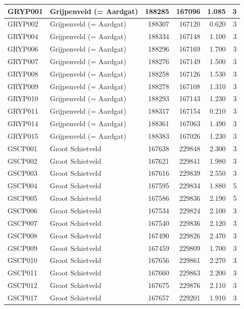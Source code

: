 \documentclass[11pt,]{book}
\begin{document}
\begin{table}
\begin{tabular}[t]{l|l|r|r|r|r}
\hline
GRYP001 & Grijpenveld (= Aardgat) & 188285 & 167096 & 1.085 & 3\\
\hline
GRYP002 & Grijpenveld (= Aardgat) & 188307 & 167120 & 0.620 & 3\\
\hline
GRYP004 & Grijpenveld (= Aardgat) & 188334 & 167148 & 1.100 & 3\\
\hline
GRYP006 & Grijpenveld (= Aardgat) & 188296 & 167169 & 1.700 & 3\\
\hline
GRYP007 & Grijpenveld (= Aardgat) & 188276 & 167149 & 1.500 & 3\\
\hline
GRYP008 & Grijpenveld (= Aardgat) & 188258 & 167126 & 1.530 & 3\\
\hline
GRYP009 & Grijpenveld (= Aardgat) & 188278 & 167108 & 1.310 & 3\\
\hline
GRYP010 & Grijpenveld (= Aardgat) & 188293 & 167143 & 1.230 & 3\\
\hline
GRYP011 & Grijpenveld (= Aardgat) & 188317 & 167154 & 0.210 & 3\\
\hline
GRYP014 & Grijpenveld (= Aardgat) & 188361 & 167063 & 1.490 & 3\\
\hline
GRYP015 & Grijpenveld (= Aardgat) & 188383 & 167026 & 1.230 & 3\\
\hline
GSCP001 & Groot Schietveld & 167638 & 229848 & 2.300 & 3\\
\hline
GSCP002 & Groot Schietveld & 167621 & 229841 & 1.980 & 3\\
\hline
GSCP003 & Groot Schietveld & 167616 & 229839 & 2.550 & 3\\
\hline
GSCP004 & Groot Schietveld & 167595 & 229834 & 1.880 & 5\\
\hline
GSCP005 & Groot Schietveld & 167586 & 229836 & 2.190 & 5\\
\hline
GSCP006 & Groot Schietveld & 167534 & 229824 & 2.100 & 3\\
\hline
GSCP007 & Groot Schietveld & 167540 & 229836 & 2.120 & 3\\
\hline
GSCP008 & Groot Schietveld & 167490 & 229826 & 2.470 & 3\\
\hline
GSCP009 & Groot Schietveld & 167459 & 229809 & 1.700 & 3\\
\hline
GSCP010 & Groot Schietveld & 167656 & 229861 & 2.270 & 3\\
\hline
GSCP011 & Groot Schietveld & 167660 & 229863 & 2.200 & 3\\
\hline
GSCP012 & Groot Schietveld & 167675 & 229876 & 2.110 & 3\\
\hline
GSCP017 & Groot Schietveld & 167657 & 229201 & 1.910 & 3\\

\end{tabular}
\end{table}
\end{document}
